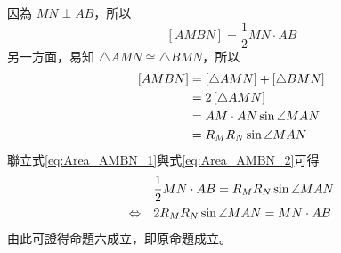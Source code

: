 因為 $MN\perp AB$，所以
\begin{equation}
  \left[AMBN\right]=\frac{1}{2}MN\cdot AB\label{eq:Area_AMBN_1}
\end{equation}
另一方面，易知 $\triangle{AMN}\cong\triangle{BMN}$，所以
\begin{align}
  \left[AMBN\right]&=\left[\triangle{AMN}\right]+\left[\triangle{BMN}\right]\notag\\
  &=2\left[\triangle{AMN}\right]\notag\\
  &=AM\cdot AN\sin{\angle{MAN}}\notag\\
  &=R_MR_N\sin{\angle{MAN}}\label{eq:Area_AMBN_2}
\end{align}
聯立式\eqref{eq:Area_AMBN_1}與式\eqref{eq:Area_AMBN_2}可得
\begin{align}
  &\frac{1}{2}MN\cdot AB=R_MR_N\sin{\angle{MAN}}\notag\\
  \Leftrightarrow\quad&2R_MR_N\sin{\angle{MAN}}=MN\cdot AB
\end{align}
由此可證得命題六成立，即原命題成立。
